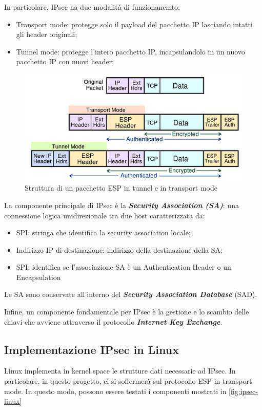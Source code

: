 \documentclass{article}
\begin{document}
In particolare, IPsec ha due modalità di funzionanemto:
\begin{itemize}
  \item Transport mode: protegge solo il payload del pacchetto IP lasciando intatti gli 
    header originali;
  \item Tunnel mode: protegge l'intero pacchetto IP, incapsulandolo in un nuovo pacchetto IP
    con nuovi header;
\end{itemize}

\begin{figure}[h]
  \begin{center}
    \includegraphics[width=.8\textwidth]{figures/esp-packet.png}
  \end{center}
  \caption{Struttura di un pacchetto ESP in tunnel e in transport mode}\label{fig:esp-packet}
\end{figure}

La componente principale di IPsec è la \textbf{\textit{Security Association (SA)}}: 
una connessione logica unidirezionale tra due host caratterizzata da:
\begin{itemize}
  \item SPI: stringa che identifica la security association locale;
  \item Indirizzo IP di destinazione: indirizzo della destinazione della SA;
  \item SPI: identifica se l'associazione SA è un Authentication Header o un 
      Encapsulation
\end{itemize}
Le SA sono conservate all'interno del \textbf{\textit{Security Association Database}} (SAD).

Infine, un componente fondamentale per IPsec è la gestione e lo scambio delle chiavi che 
avviene attraverso il protocollo \textbf{\textit{Internet Key Exchange}}.

\subsection{Implementazione IPsec in Linux}
Linux implementa in kernel space le strutture dati necessarie ad IPsec. In particolare,
in questo progetto, ci si soffermerà sul protocollo ESP in transport mode. In questo modo,
possono essere testati i componenti mostrati in \cref{fig:ipsec-linux}
\end{document}
